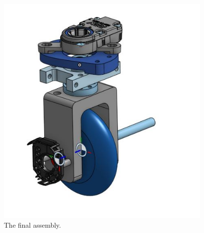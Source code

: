 \begin{figure}[htp]
\centering
\includegraphics[width=0.95\textwidth, angle=0]{Meetings/October/10-20-21/10-20-21_CAD_Figure3 - Nathan Forrer.JPG}
\caption{The final assembly.}
\label{fig:pic3}
\end{figure}


